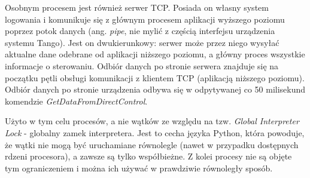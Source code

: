 Osobnym procesem jest również serwer TCP. Posiada on własny system logowania i komunikuje się z głównym procesem aplikacji wyższego poziomu poprzez potok danych (ang. \emph{pipe}, nie mylić z częścią interfejsu urządzenia systemu Tango). Jest on dwukierunkowy: serwer może przez niego wysyłać aktualne dane odebrane od aplikacji niższego poziomu, a główny proces wszystkie informacje o sterowaniu. Odbiór danych po stronie serwera znajduje się na początku pętli obsługi komunikacji z klientem TCP (aplikacją niższego poziomu). Odbiór danych po stronie urządzenia odbywa się w odpytywanej co 50 milisekund komendzie \emph{GetDataFromDirectControl}.

Użyto w tym celu procesów, a nie wątków ze względu na tzw. \emph{Global Interpreter Lock} - globalny zamek interpretera. Jest to cecha języka Python, która powoduje, że wątki nie mogą być uruchamiane równolegle (nawet w przypadku dostępnych rdzeni procesora), a zawsze są tylko współbieżne. Z kolei procesy nie są objęte tym ograniczeniem i można ich używać w prawdziwie równoległy sposób.
